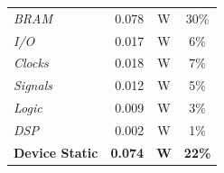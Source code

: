 \documentclass[11pt]{article}
\begin{document}
\begin{table}[H]
\begin{minipage}[b]{0.50\textwidth}
\begin{tabular}{lrcc}
            \quad \textit{BRAM}               & 0.078 & W & 30\% \\
            \quad \textit{I/O}                & 0.017 & W &  6\% \\
            \quad \textit{Clocks}             & 0.018 & W &  7\% \\
            \quad \textit{Signals}            & 0.012 & W &  5\% \\
            \quad \textit{Logic}              & 0.009 & W &  3\% \\
            \quad \textit{DSP}                & 0.002 & W &  1\% \\
            \midrule
            \textbf{Device Static} & \textbf{0.074} & \textbf{W} & \textbf{22\%} \\
            \bottomrule
        \end{tabular}
    \end{minipage}
    
\end{table}
\end{document}
